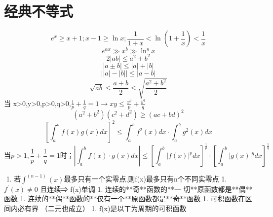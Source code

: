 \documentclass[UTF8]{ctexart}
\begin{document}
\section{经典不等式}
$$e^x \geq x+1 ; x-1 \geq \ln x ; \frac{1}{1+x} < \ln \left( 1+ \frac{1}{x} \right) < \frac{1}{x}$$
$$ e^{αx} \gg x^b \gg \ln^y x $$
$$ 2\left| ab \right| \leq a^2+b^2$$
$$ \left| a \pm b \right| \leq |a|+|b|$$
$$ \left| |a| - |b| \right| \leq |a-b|$$
$$\sqrt{ab} \leq \frac{a+b}{2} \leq \sqrt{\frac{a^2+b^2}{2}}$$
当 x>0,y>0,p>0,q>0,$\frac{1}{p}+\frac{1}{q}=1 \rightarrow xy \leq \frac{x^p}{p}+\frac{y^q}{q}$
$$(a^2+b^2)(c^2+d^2) \geq (ac+bd)^2$$
$$ [\int_a^b f(x)g(x)dx]^2 \leq \int_a^b f^2(x)dx\cdot \int_a^b g^2(x)dx$$
$$\mbox{当} p>1, \frac{1}{p}+\frac{1}{q}=1 \mbox{时；} \left| \int_a^b f(x) \cdot g(x)dx\right| \leq \left[ \int_a^b \left| f(x) \right|^p dx \right] ^\frac{1}{p} \cdot \left[ \int_a^b \left| g(x) \right|^q dx \right] ^\frac{1}{q}$$

​
1. 若$\int^{(n−1)}(x)$最多只有一个实零点,则f(x)最多只有n个不同实零点
1. $f^′(x)≠0$ 且连续⇒ f(x)单调
1. 连续的**奇**函数的**一  切**原函数都是**偶**函数
1. 连续的**偶**函数的**仅有一个**原函数都是**奇**函数
1. 可积函数在区间内必有界 （二元也成立）
1. f(x)是以ㄒ为周期的可积函数
\end{document}
